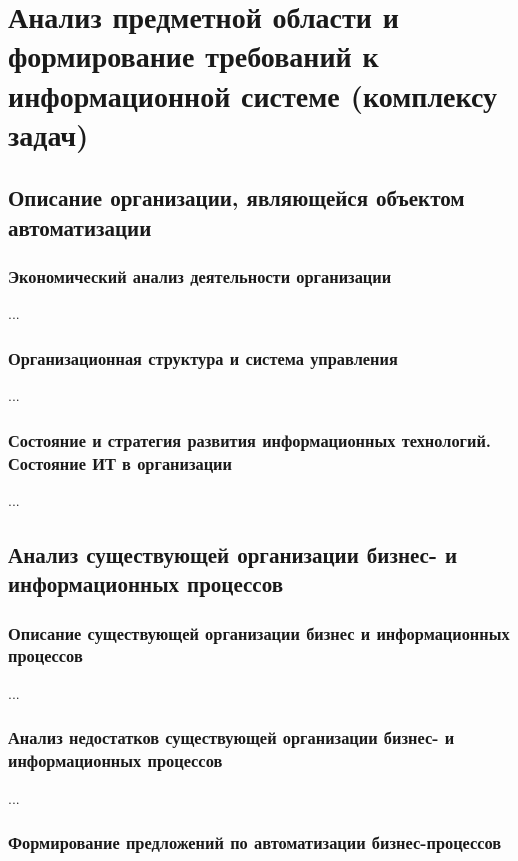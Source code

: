 \documentclass[../thesis.tex]{subfiles}
\begin{document}
\section{Анализ предметной области и формирование требований к информационной системе (комплексу задач)}
\subsection{Описание организации, являющейся объектом автоматизации}
\subsubsection{Экономический анализ деятельности организации}

...

\subsubsection{Организационная структура и система управления}

...

\subsubsection{Состояние и стратегия развития информационных технологий. Состояние ИТ в организации}

...



\subsection{Анализ существующей организации бизнес- и информационных процессов}
\subsubsection{Описание существующей организации бизнес и информационных процессов}

...

\subsubsection{Анализ недостатков существующей организации бизнес- и информационных процессов}

...

\subsubsection{Формирование предложений по автоматизации бизнес-процессов}
\end{document}
